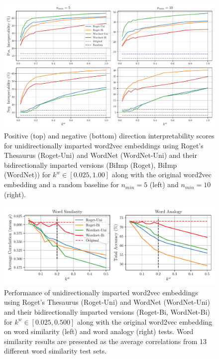\documentclass[11pt,a4paper]{article}
\def\proposedmethod{BiImp}
\begin{document}
\begin{figure}
	\centering
	\includegraphics[width=16cm]{Figures/interpretability_wordnet_vs_roget.pdf}
	\caption{Positive (top) and negative (bottom)
          direction interpretability scores for
          unidirectionally imparted word2vec embeddings
          using Roget's Thesaurus (Roget-Uni) and WordNet
          (WordNet-Uni) and their bidirectionally imparted
          versions (\proposedmethod{} (Roget), \proposedmethod{} (WordNet)) for $k^w \in [0.025,1.00]$ along with the original word2vec embedding and a random baseline for $n_{min} = 5$ (left) and $n_{min} = 10$ (right).}
	\label{fig:wordnet_vs_roget}
\end{figure}

\begin{figure}
	\centering
	\includegraphics[width=16cm]{Figures/similarity_and_analogy.pdf}
	\caption{Performance of unidirectionally imparted word2vec embeddings using Roget's Thesaurus (Roget-Uni) and WordNet (WordNet-Uni) and their bidirectionally imparted versions (Roget-Bi, WordNet-Bi) for $k^w \in [0.025, 0.500]$ along with the original word2vec embedding on word similarity (left) and word analogy (right) tests. Word similarity results are presented as the average correlations from 13 different word similarity test sets.}
	\label{fig:sim_and_analogy}
\end{figure}
\end{document}
